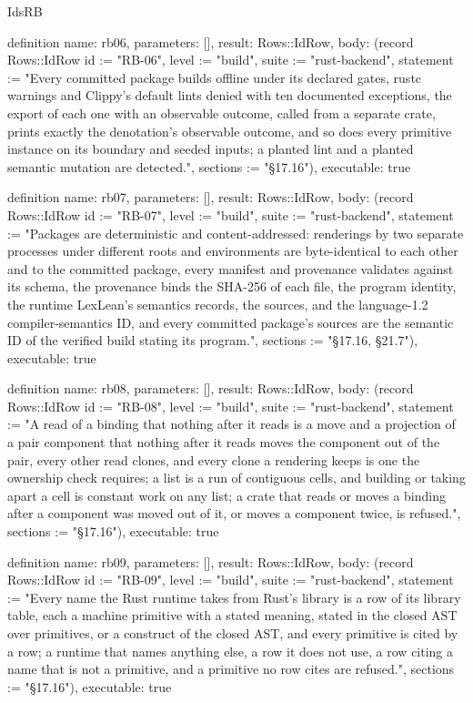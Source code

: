 \begin{lexlean}{IdsRB}
\begin{semanticmodule}
definition{
  name: rb06,
  parameters: [],
  result: Rows::IdRow,
  body: (record Rows::IdRow {id := "RB-06", level := "build", suite := "rust-backend", statement := "Every committed package builds offline under its declared gates, rustc warnings and Clippy's default lints denied with ten documented exceptions, the export of each one with an observable outcome, called from a separate crate, prints exactly the denotation's observable outcome, and so does every primitive instance on its boundary and seeded inputs; a planted lint and a planted semantic mutation are detected.", sections := "§17.16"}),
  executable: true
}

definition{
  name: rb07,
  parameters: [],
  result: Rows::IdRow,
  body: (record Rows::IdRow {id := "RB-07", level := "build", suite := "rust-backend", statement := "Packages are deterministic and content-addressed: renderings by two separate processes under different roots and environments are byte-identical to each other and to the committed package, every manifest and provenance validates against its schema, the provenance binds the SHA-256 of each file, the program identity, the runtime LexLean's semantics records, the sources, and the language-1.2 compiler-semantics ID, and every committed package's sources are the semantic ID of the verified build stating its program.", sections := "§17.16, §21.7"}),
  executable: true
}

definition{
  name: rb08,
  parameters: [],
  result: Rows::IdRow,
  body: (record Rows::IdRow {id := "RB-08", level := "build", suite := "rust-backend", statement := "A read of a binding that nothing after it reads is a move and a projection of a pair component that nothing after it reads moves the component out of the pair, every other read clones, and every clone a rendering keeps is one the ownership check requires; a list is a run of contiguous cells, and building or taking apart a cell is constant work on any list; a crate that reads or moves a binding after a component was moved out of it, or moves a component twice, is refused.", sections := "§17.16"}),
  executable: true
}

definition{
  name: rb09,
  parameters: [],
  result: Rows::IdRow,
  body: (record Rows::IdRow {id := "RB-09", level := "build", suite := "rust-backend", statement := "Every name the Rust runtime takes from Rust's library is a row of its library table, each a machine primitive with a stated meaning, stated in the closed AST over primitives, or a construct of the closed AST, and every primitive is cited by a row; a runtime that names anything else, a row it does not use, a row citing a name that is not a primitive, and a primitive no row cites are refused.", sections := "§17.16"}),
  executable: true
}


\end{semanticmodule}
\end{lexlean}

